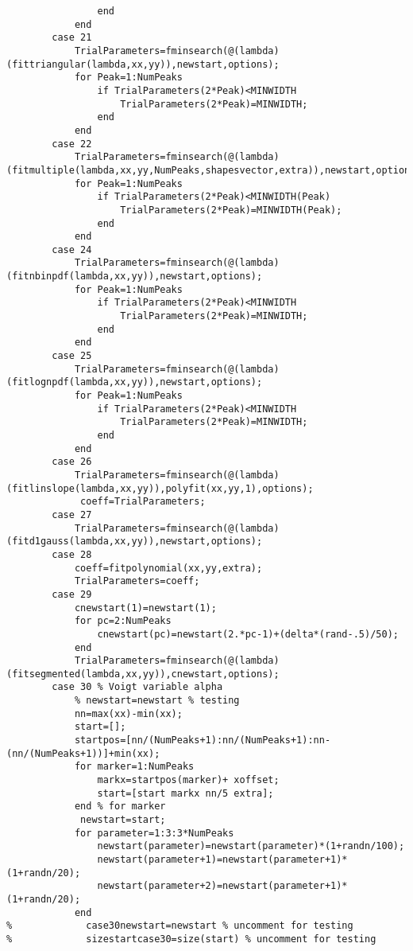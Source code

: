 \begin{lstlisting}
                end
            end
        case 21
            TrialParameters=fminsearch(@(lambda)(fittriangular(lambda,xx,yy)),newstart,options);
            for Peak=1:NumPeaks
                if TrialParameters(2*Peak)<MINWIDTH
                    TrialParameters(2*Peak)=MINWIDTH;
                end
            end
        case 22
            TrialParameters=fminsearch(@(lambda)(fitmultiple(lambda,xx,yy,NumPeaks,shapesvector,extra)),newstart,options);
            for Peak=1:NumPeaks
                if TrialParameters(2*Peak)<MINWIDTH(Peak)
                    TrialParameters(2*Peak)=MINWIDTH(Peak);
                end
            end
        case 24
            TrialParameters=fminsearch(@(lambda)(fitnbinpdf(lambda,xx,yy)),newstart,options);
            for Peak=1:NumPeaks
                if TrialParameters(2*Peak)<MINWIDTH
                    TrialParameters(2*Peak)=MINWIDTH;
                end
            end
        case 25
            TrialParameters=fminsearch(@(lambda)(fitlognpdf(lambda,xx,yy)),newstart,options);
            for Peak=1:NumPeaks
                if TrialParameters(2*Peak)<MINWIDTH
                    TrialParameters(2*Peak)=MINWIDTH;
                end
            end
        case 26
            TrialParameters=fminsearch(@(lambda)(fitlinslope(lambda,xx,yy)),polyfit(xx,yy,1),options);
             coeff=TrialParameters;
        case 27
            TrialParameters=fminsearch(@(lambda)(fitd1gauss(lambda,xx,yy)),newstart,options);
        case 28
            coeff=fitpolynomial(xx,yy,extra);
            TrialParameters=coeff;
        case 29
            cnewstart(1)=newstart(1);
            for pc=2:NumPeaks
                cnewstart(pc)=newstart(2.*pc-1)+(delta*(rand-.5)/50);
            end
            TrialParameters=fminsearch(@(lambda)(fitsegmented(lambda,xx,yy)),cnewstart,options);
        case 30 % Voigt variable alpha
            % newstart=newstart % testing
            nn=max(xx)-min(xx);
            start=[];
            startpos=[nn/(NumPeaks+1):nn/(NumPeaks+1):nn-(nn/(NumPeaks+1))]+min(xx);
            for marker=1:NumPeaks
                markx=startpos(marker)+ xoffset;
                start=[start markx nn/5 extra];
            end % for marker
             newstart=start;
            for parameter=1:3:3*NumPeaks
                newstart(parameter)=newstart(parameter)*(1+randn/100);
                newstart(parameter+1)=newstart(parameter+1)*(1+randn/20);
                newstart(parameter+2)=newstart(parameter+1)*(1+randn/20);
            end
%             case30newstart=newstart % uncomment for testing
%             sizestartcase30=size(start) % uncomment for testing

\end{lstlisting}
